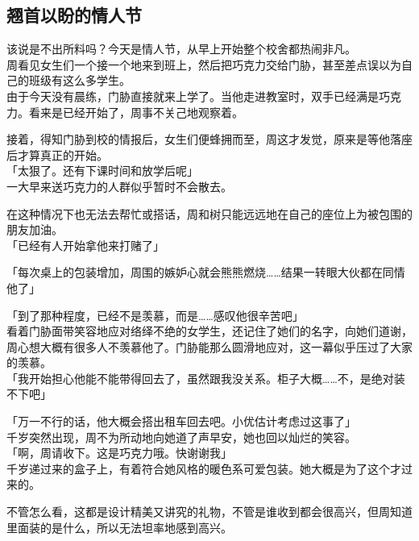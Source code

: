 \subsection{翘首以盼的情人节}

该说是不出所料吗？今天是情人节，从早上开始整个校舍都热闹非凡。\\

周看见女生们一个接一个地来到班上，然后把巧克力交给门胁，甚至差点误以为自己的班级有这么多学生。\\

由于今天没有晨练，门胁直接就来上学了。当他走进教室时，双手已经满是巧克力。看来是已经开始了，周事不关己地观察着。

接着，得知门胁到校的情报后，女生们便蜂拥而至，周这才发觉，原来是等他落座后才算真正的开始。\\

「太狠了。还有下课时间和放学后呢」\\

一大早来送巧克力的人群似乎暂时不会散去。

在这种情况下也无法去帮忙或搭话，周和树只能远远地在自己的座位上为被包围的朋友加油。\\

「已经有人开始拿他来打赌了」

「每次桌上的包装增加，周围的嫉妒心就会熊熊燃烧……结果一转眼大伙都在同情他了」

「到了那种程度，已经不是羡慕，而是……感叹他很辛苦吧」\\

看着门胁面带笑容地应对络绎不绝的女学生，还记住了她们的名字，向她们道谢，周心想大概有很多人不羡慕他了。门胁能那么圆滑地应对，这一幕似乎压过了大家的羡慕。\\

「我开始担心他能不能带得回去了，虽然跟我没关系。柜子大概……不，是绝对装不下吧」

「万一不行的话，他大概会搭出租车回去吧。小优估计考虑过这事了」\\

千岁突然出现，周不为所动地向她道了声早安，她也回以灿烂的笑容。\\

「啊，周请收下。这是巧克力哦。快谢谢我」\\

千岁递过来的盒子上，有着符合她风格的暖色系可爱包装。她大概是为了这个才过来的。

不管怎么看，这都是设计精美又讲究的礼物，不管是谁收到都会很高兴，但周知道里面装的是什么，所以无法坦率地感到高兴。\\

